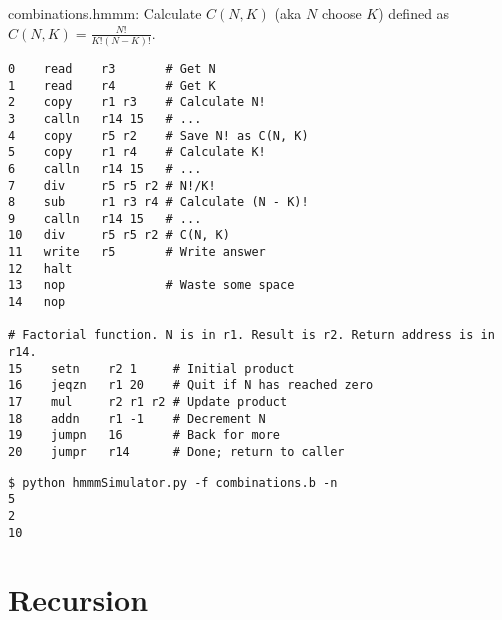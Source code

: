 \documentclass[8pt,a4paper,compress,handout]{beamer}
\begin{document}
\begin{frame}[fragile]
\begin{framed}
\tiny combinations.hmmm: Calculate $C(N, K)$ (aka $N$ choose $K$) defined as $C(N, K)=\frac{N!}{K!(N-K)!}$.
\end{framed}

\begin{lstlisting}[language={}]
0    read    r3       # Get N
1    read    r4       # Get K
2    copy    r1 r3    # Calculate N!
3    calln   r14 15   # ...
4    copy    r5 r2    # Save N! as C(N, K)
5    copy    r1 r4    # Calculate K!
6    calln   r14 15   # ...
7    div     r5 r5 r2 # N!/K!
8    sub     r1 r3 r4 # Calculate (N - K)!
9    calln   r14 15   # ...
10   div     r5 r5 r2 # C(N, K)
11   write   r5       # Write answer
12   halt
13   nop              # Waste some space
14   nop

# Factorial function. N is in r1. Result is r2. Return address is in r14.
15    setn    r2 1     # Initial product
16    jeqzn   r1 20    # Quit if N has reached zero
17    mul     r2 r1 r2 # Update product
18    addn    r1 -1    # Decrement N
19    jumpn   16       # Back for more
20    jumpr   r14      # Done; return to caller
\end{lstlisting}

\begin{lstlisting}[language={}]
$ python hmmmSimulator.py -f combinations.b -n
5
2
10
\end{lstlisting}
\end{frame}

\section{Recursion}
\end{document}
